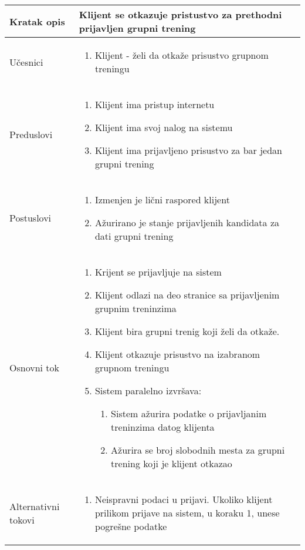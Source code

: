 \documentclass[../grupniTreninzi.tex]{subfiles}
\begin{document}
\begin{longtable}{| p{} | p{} |} 
\hline
    Kratak opis &  Klijent se otkazuje pristustvo za prethodni prijavljen grupni trening\\ 
\hline    
    Učesnici &
    \begin{enumerate}
        \item Klijent - želi da otkaže prisustvo grupnom treningu
    \end{enumerate}\\
\hline
   Preduslovi & 
   \begin{enumerate}
        \item Klijent ima pristup internetu
        \item Klijent ima svoj nalog na sistemu
        \item Klijent ima prijavljeno prisustvo za bar jedan grupni trening
    \end{enumerate}\\
\hline  
    Postuslovi &
    \begin{enumerate}
        \item Izmenjen je lični raspored klijent
        \item Ažurirano je stanje prijavljenih kandidata za dati grupni trening
    \end{enumerate}\\
\hline
    Osnovni tok & 
    \begin{enumerate}
        \item Krijent se prijavljuje na sistem
        \item Klijent odlazi na deo stranice sa prijavljenim grupnim treninzima
        \item Klijent bira grupni trenig koji želi da otkaže.
        \item Klijent otkazuje prisustvo na izabranom grupnom treningu
        \item Sistem paralelno izvršava:
            \begin{enumerate}
                \item Sistem ažurira podatke o prijavljanim treninzima datog klijenta
                \item Ažurira se broj slobodnih mesta za grupni trening koji je klijent otkazao
            \end{enumerate}
    \end{enumerate}\\
\hline
    Alternativni tokovi & 
       \begin{enumerate}
        \item Neispravni podaci u prijavi. Ukoliko klijent prilikom prijave na sistem, u koraku 1, unese pogrešne podatke

\end{enumerate}
\end{longtable}
\end{document}
